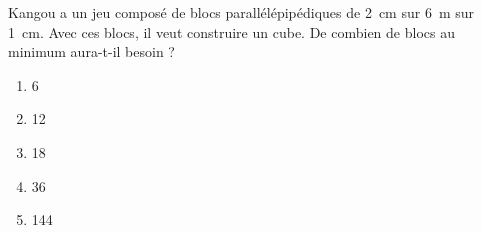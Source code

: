 Kangou a un jeu composé de blocs parallélépipédiques de 2~cm sur 6~m sur 1~cm. Avec ces blocs, il veut construire un cube. De combien de blocs au minimum aura-t-il besoin ?
\begin{multicols}{5}
  \begin{enumerate}[A/]
  \item 6
  \item 12
  \item 18
  \item 36
  \item 144
  \end{enumerate}
\end{multicols}